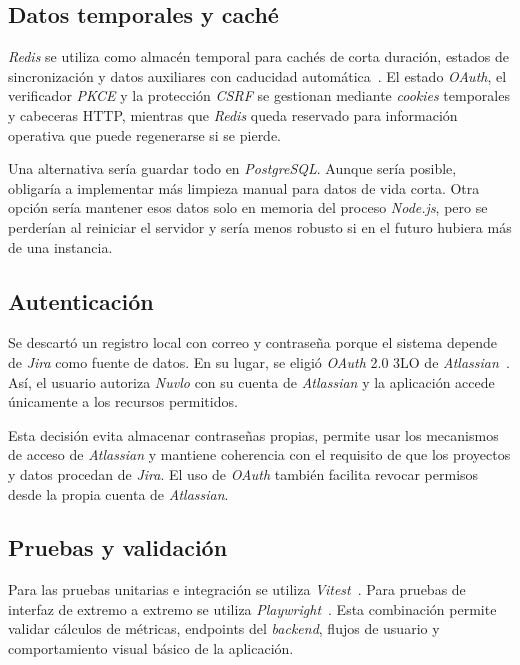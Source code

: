 \subsection{Datos temporales y caché}

\textit{Redis} se utiliza como almacén temporal para cachés de corta duración, estados de sincronización y datos auxiliares con caducidad automática~\cite{RedisDocs}. El estado \textit{OAuth}, el verificador \textit{PKCE} y la protección \textit{CSRF} se gestionan mediante \textit{cookies} temporales y cabeceras HTTP, mientras que \textit{Redis} queda reservado para información operativa que puede regenerarse si se pierde.

Una alternativa sería guardar todo en \textit{PostgreSQL}. Aunque sería posible, obligaría a implementar más limpieza manual para datos de vida corta. Otra opción sería mantener esos datos solo en memoria del proceso \textit{Node.js}, pero se perderían al reiniciar el servidor y sería menos robusto si en el futuro hubiera más de una instancia.

\subsection{Autenticación}

Se descartó un registro local con correo y contraseña porque el sistema depende de \textit{Jira} como fuente de datos. En su lugar, se eligió \textit{OAuth} 2.0 3LO de \textit{Atlassian}~\cite{AtlassianOAuth3LO}. Así, el usuario autoriza \textit{Nuvlo} con su cuenta de \textit{Atlassian} y la aplicación accede únicamente a los recursos permitidos.

Esta decisión evita almacenar contraseñas propias, permite usar los mecanismos de acceso de \textit{Atlassian} y mantiene coherencia con el requisito de que los proyectos y datos procedan de \textit{Jira}. El uso de \textit{OAuth} también facilita revocar permisos desde la propia cuenta de \textit{Atlassian}.

\subsection{Pruebas y validación}

Para las pruebas unitarias e integración se utiliza \textit{Vitest}~\cite{VitestGuide}. Para pruebas de interfaz de extremo a extremo se utiliza \textit{Playwright}~\cite{PlaywrightDocs}. Esta combinación permite validar cálculos de métricas, endpoints del \textit{backend}, flujos de usuario y comportamiento visual básico de la aplicación.

